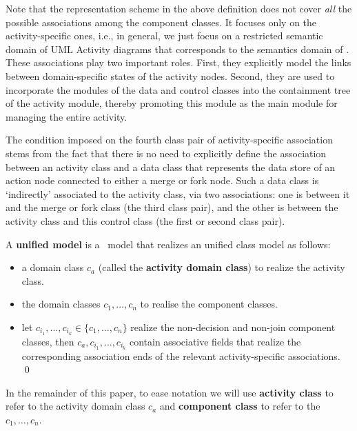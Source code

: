 Note that the representation scheme in the above definition does not cover \textit{all} the possible associations among the component classes. It focuses only on the activity-specific ones, i.e., in general, we just focus on a restricted semantic domain of UML Activity diagrams that corresponds to the semantics domain of \agl. %
%
These associations play two important roles. First, they explicitly model the links between domain-specific states of the activity nodes. Second, they are used to incorporate the modules of the data and control classes into the containment tree of the activity module, thereby promoting this module as the main module for managing the entire activity.

The condition imposed on the fourth class pair of activity-specific association stems from the fact that there is no need to explicitly define the association between an activity class and a data class that represents the data store of an action node connected to either a merge or fork node. Such a data class is `indirectly' associated to the activity class, via two associations: one is between it and the merge or fork class (the third class pair), and the other is between the activity class and this control class (the first or second class pair).

\begin{definition} \label{def:unified-model}
	A \textbf{unified model} is a \dcsl~model that realizes an unified class model as follows:
	\begin{itemize}%
		\item a domain class $ c_a $ (called the \textbf{activity domain class}) to realize the activity class.
		\item the domain classes $ c_1,\dots,c_n $ to realise the component classes.
		\item let $ c_{i_1},\dots,c_{i_k} \in \{c_1,\dots,c_n\} $ realize the non-decision and non-join component classes, then $ c_a,c_{i_1},\dots,c_{i_k} $ contain associative fields that realize the corresponding association ends of the relevant activity-specific associations. \qed
	\end{itemize}
\end{definition}

In the remainder of this paper, to ease notation we will use \textbf{activity class} to refer to the activity domain class $ c_a $ and \textbf{component class} to refer to the $ c_1,\dots,c_n $. 

